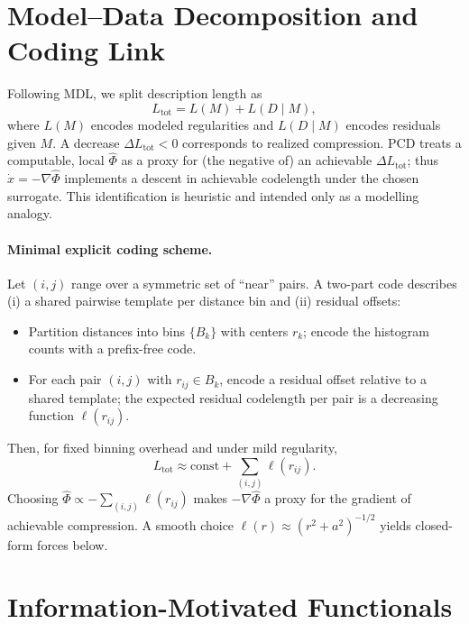 \documentclass[11pt,a4paper]{article}
\numberwithin{equation}{section}
\begin{document}
\section{Model--Data Decomposition and Coding Link}
Following MDL, we split description length as
\begin{equation}
\label{eq:Ltot}
L_{\text{tot}} = L(M) + L(D\mid M),
\end{equation}
where $L(M)$ encodes modeled regularities and $L(D\mid M)$ encodes residuals given $M$. A decrease $\Delta L_{\text{tot}}<0$ corresponds to realized compression. PCD treats a computable, local $\widehat{\Phi}$ as a proxy for (the negative of) an achievable $\Delta L_{\text{tot}}$; thus $\dot x=-\nabla\widehat{\Phi}$ implements a descent in achievable codelength under the chosen surrogate. 
This identification is heuristic and intended only as a modelling analogy.

\paragraph{Minimal explicit coding scheme.}
Let $(i,j)$ range over a symmetric set of ``near'' pairs. A two-part code describes (i) a shared pairwise template per distance bin and (ii) residual offsets:
\begin{itemize}
\item Partition distances into bins $\{B_k\}$ with centers $r_k$; encode the histogram counts with a prefix-free code.
\item For each pair $(i,j)$ with $r_{ij}\in B_k$, encode a residual offset relative to a shared template; the expected residual codelength per pair is a decreasing function $\ell(r_{ij})$.
\end{itemize}
Then, for fixed binning overhead and under mild regularity,
\begin{equation}
\label{eq:Ltotsum}
L_{\text{tot}} \approx \text{const} + \sum_{(i,j)} \ell(r_{ij}).
\end{equation}
Choosing $\widehat{\Phi}\propto -\sum_{(i,j)} \ell(r_{ij})$ makes $-\nabla\widehat{\Phi}$ a proxy for the gradient of achievable compression. A smooth choice $\ell(r)\approx (r^2+a^2)^{-1/2}$ yields closed-form forces below.

\section{Information-Motivated Functionals}
\end{document}
